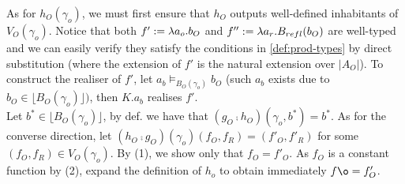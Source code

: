 \documentclass[12pt,a4paper]{article}
\def\rfl{_{refl}}
\renewcommand{\O}{_{O}}\alwaysmath{O}
\newcommand{\R}{\ensuremath{_{R}}}
\begin{document}
As for $h\O(\gamma_o)$, we must first ensure that $h\O$ outputs well-defined inhabitants of $V\O(\gamma_o)$. Notice that both $f' \define \lambda a_o. b\O$ and $f'' \define \lambda a_r. B\rfl(b\O)$ are well-typed and we can easily verify they satisfy the conditions in \cref{def:prod-types} by direct substitution (where the extension of $f'$ is the natural extension over $|A\O|$). To construct the realiser of $f'$, let $a_b \vDash_{B\O(\gamma_o)} b\O$ (such $a_b$ exists due to $b\O \in \lfloor B\O(\gamma_o)\rfloor)$, then $K. a_b$ realises $f'$.\\

Let $b^* \in \lfloor B\O(\gamma_o) \rfloor$, by def. we have that $ (g\O \comp h\O)(\gamma_o, b^*) = b^*$. As for the converse direction, let $(h\O \comp  g\O)(\gamma_o)(f\O, f\R)=(f'\O, f'\R)$ for some $(f\O, f\R) \in V\O(\gamma_o)$. By (1), we show only that $f\O = f'\O$. As $f\O$ is a constant function by (2), expand the definition of $h_o$ to obtain immediately $f\o = f'\O$.

\printbibliography
\end{document}
